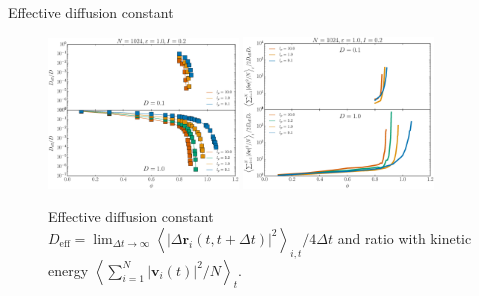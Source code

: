 \documentclass{beamer}
\begin{document}
\begin{frame}{Effective diffusion constant}

\begin{figure}
\centering
\includegraphics[width=0.45\textwidth]{Deff.eps}
\includegraphics[width=0.45\textwidth]{DeffV2.eps}
\caption{ Effective diffusion constant $D_{\mathrm{eff}} = \lim_{\Delta t \to \infty} \left<|\Delta\boldsymbol{r}_i(t, t + \Delta t)|^2\right>_{i, t}/4\Delta t$ and ratio with kinetic energy $\left<\sum_{i=1}^N |\boldsymbol{v}_i(t)|^2/N\right>_t$.}
\end{figure}


\end{frame}
\end{document}

